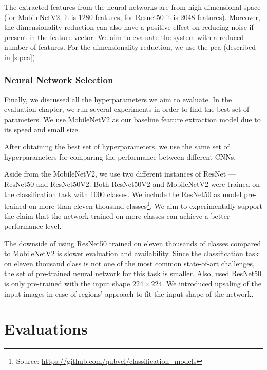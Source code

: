 The extracted features from the neural networks are from high-dimensional space (for MobileNetV2, it is 1280 features, for Resnet50 it is 2048 features). Moreover, the dimensionality reduction can also have a positive effect on reducing noise if present in the feature vector. We aim to evaluate the system with a reduced number of features. For the dimensionality reduction, we use the \acrlong{pca} (described in \autoref{s:pca}).

\subsection{Neural Network Selection}

Finally, we discussed all the hyperparameters we aim to evaluate. In the evaluation chapter, we run several experiments in order to find the best set of parameters. We use MobileNetV2 as our baseline feature extraction model due to its speed and small size.

After obtaining the best set of hyperparameters, we use the same set of hyperparameters for comparing the performance between different CNNs.

Aside from the MobileNetV2, we use two different instances of ResNet --- ResNet50 and ResNet50V2. Both ResNet50V2 and MobileNetV2 were trained on the classification task with 1000 classes. We include the ResNet50 as model pre-trained on more than eleven thousand classes\footnote{Source: \url{https://github.com/qubvel/classification\_models}}. We aim to experimentally support the claim that the network trained on more classes can achieve a better performance level. 

The downside of using ResNet50 trained on eleven thousands of classes compared to MobileNetV2 is slower evaluation and availability. Since the classification task on eleven thousand class is not one of the most common state-of-art challenges, the set of pre-trained neural network for this task is smaller. Also, used ResNet50 is only pre-trained with the input shape $224\times224$. We introduced upsaling of the input images in case of regions' approach to fit the input shape of the network.





% 
% 
% 










\chapter{Evaluations}
\label{ch:evaluation}

